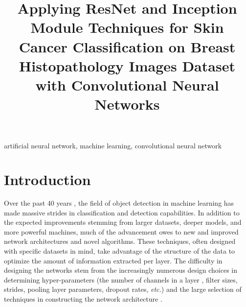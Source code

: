 \documentclass[conference]{IEEEtran}
\begin{document}


\title{Applying ResNet and Inception Module Techniques for Skin Cancer Classification on Breast Histopathology Images Dataset with Convolutional Neural Networks\\
}

\author{
}

\maketitle

\begin{abstract}

\end{abstract}

\begin{IEEEkeywords}
artificial neural network, machine learning, convolutional neural network
\end{IEEEkeywords}

\section{Introduction}
Over the past 40 years \cite{Fukushima1980}, the field of object detection in machine learning has made massive strides in classification and detection capabilities. In addition to the expected improvements stemming from larger datasets, deeper models, and more powerful machines, much of the advancement owes to new and improved network architectures and novel algorithms. These techniques, often designed with specific datasets in mind, take advantage of the structure of the data to optimize the amount of information extracted per layer. The difficulty in designing the networks stem from the increasingly numerous design choices in determining hyper-parameters (the number of channels in a layer , filter sizes, strides, pooling layer parameters, dropout rates, \emph{etc.}) and the large selection of techniques in constructing the network architecture \cite{Krizhevsky2012, Szegedy2014, He2016, Huang2016, Simonyan2014, Hu2017, Xie2017, huang2019convolutional, Zhao2021}.
\end{document}
